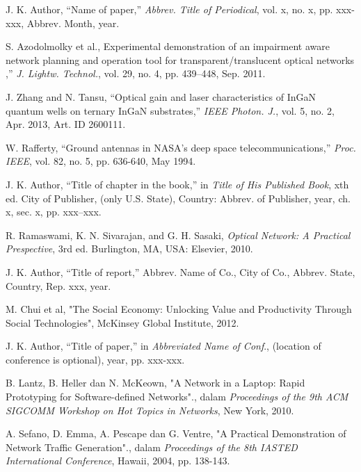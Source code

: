 %
% 

% 
% 
\begin{thebibliography}{99}

{J. K. Author, “Name of paper,” \textit{Abbrev. Title of Periodical}, vol. x, no. x, pp. xxx-xxx, Abbrev. Month, year.}

{S. Azodolmolky et al., Experimental demonstration of an impairment aware network planning and operation tool for transparent/translucent optical networks ,” \textit{J. Lightw. Technol.}, vol. 29, no. 4, pp. 439–448, Sep. 2011.}

{J. Zhang and N. Tansu, “Optical gain and laser characteristics of InGaN quantum wells on ternary InGaN substrates,” \textit{IEEE Photon. J.}, vol. 5, no. 2, Apr. 2013, Art. ID 2600111.}

{W. Rafferty, “Ground antennas in NASA’s deep space telecommunications,” \textit{Proc. IEEE}, vol. 82, no. 5, pp. 636-640, May 1994.}

{J. K. Author, “Title of chapter in the book,” in \textit{Title of His Published Book}, xth ed. City of Publisher, (only U.S. State), Country: Abbrev. of Publisher, year, ch. x, sec. x, pp. xxx–xxx.}

{R. Ramaswami, K. N. Sivarajan, and G. H. Sasaki, \textit{Optical Network: A Practical Prespective}, 3rd ed. Burlington, MA, USA: Elsevier, 2010.}

{J. K. Author, “Title of report,” Abbrev. Name of Co., City of Co., Abbrev. State, Country, Rep. xxx, year.}

{M. Chui et al, "The Social Economy: Unlocking Value and Productivity Through Social Technologies", McKinsey Global Institute, 2012.}

{J. K. Author, “Title of paper,” in \textit{Abbreviated Name of Conf}., (location of conference is optional), year, pp. xxx-xxx.}

{B. Lantz, B. Heller dan N. McKeown, "A Network in a Laptop: Rapid Prototyping for Software-defined Networks"., dalam \textit{Proceedings of the 9th ACM SIGCOMM Workshop on Hot Topics in Networks}, New York, 2010.}

{A. Sefano, D. Emma, A. Pescape dan G. Ventre, "A Practical Demonstration of Network Traffic Generation"., dalam \textit{Proceedings of the 8th IASTED International Conference}, Hawaii, 2004, pp. 138-143.}


\end{thebibliography}
